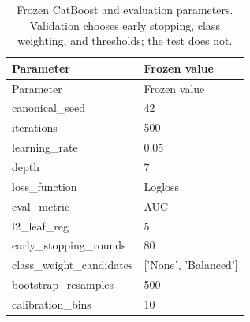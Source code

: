 \begin{longtable}{ll}
\caption{Frozen CatBoost and evaluation parameters. Validation chooses early stopping, class weighting, and thresholds; the test does not.}\label{tab:app-parameters}\\
\toprule
Parameter & Frozen value \\
\midrule
\endfirsthead
\toprule
Parameter & Frozen value \\
\midrule
\endhead
canonical\_seed & 42 \\
iterations & 500 \\
learning\_rate & 0.05 \\
depth & 7 \\
loss\_function & Logloss \\
eval\_metric & AUC \\
l2\_leaf\_reg & 5 \\
early\_stopping\_rounds & 80 \\
class\_weight\_candidates & ['None', 'Balanced'] \\
bootstrap\_resamples & 500 \\
calibration\_bins & 10 \\
\bottomrule
\end{longtable}

